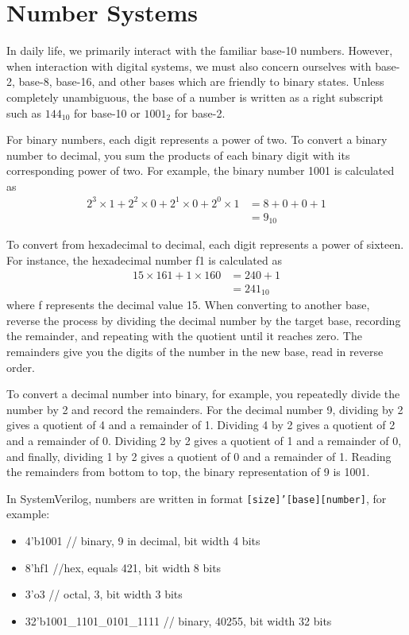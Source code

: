 \section{Number Systems}
In daily life, we primarily interact with the familiar
base-10 numbers. However, when interaction with digital
systems, we must also concern ourselves with base-2, base-8,
base-16, and other bases which are friendly to binary
states. Unless completely unambiguous, the base of a number
is written as a right subscript such as $144_{10}$ for base-10
or $1001_{2}$ for base-2.

For binary numbers, each digit represents a power of two.
To convert a binary number to decimal, you sum the products of
each binary digit with its corresponding power of two. For
example, the binary number 1001 is calculated as
\begin{align}
    2^3 \times 1 + 2^2 \times 0 + 2^1 \times 0 + 2^0 \times 1 & = 8 + 0 + 0 + 1 \\
                                                              & = 9_{10}
\end{align}

To convert from hexadecimal to decimal, each digit represents a
power of sixteen. For instance, the hexadecimal number f1 is
calculated as
\begin{align}
    15 \times 161+1 \times 160 & = 240+1    \\
                               & = 241_{10}
\end{align}
where f represents the decimal value 15.
When converting to another base, reverse the process by dividing
the decimal number by the target base, recording the remainder,
and repeating with the quotient until it reaches zero.
The remainders give you the digits of the number in the new
base, read in reverse order.

To convert a decimal number into binary, for example, you
repeatedly divide the number by 2 and record the remainders.
For the decimal number 9, dividing by 2 gives a quotient of 4
and a remainder of 1. Dividing 4 by 2 gives a quotient of 2
and a remainder of 0. Dividing 2 by 2 gives a quotient of 1
and a remainder of 0, and finally, dividing 1 by 2 gives a
quotient of 0 and a remainder of 1. Reading the remainders
from bottom to top, the binary representation of 9 is 1001.

In SystemVerilog, numbers are written in format
\texttt{[size]'[base][number]}, for example:
\begin{itemize}
    \item 4'b1001 // binary, 9 in decimal, bit width 4 bits
    \item 8'hf1 //hex, equals 421, bit width 8 bits
    \item 3'o3 // octal, 3, bit width 3 bits
    \item 32'b1001\_1101\_0101\_1111 // binary, 40255, bit width 32 bits
\end{itemize}
